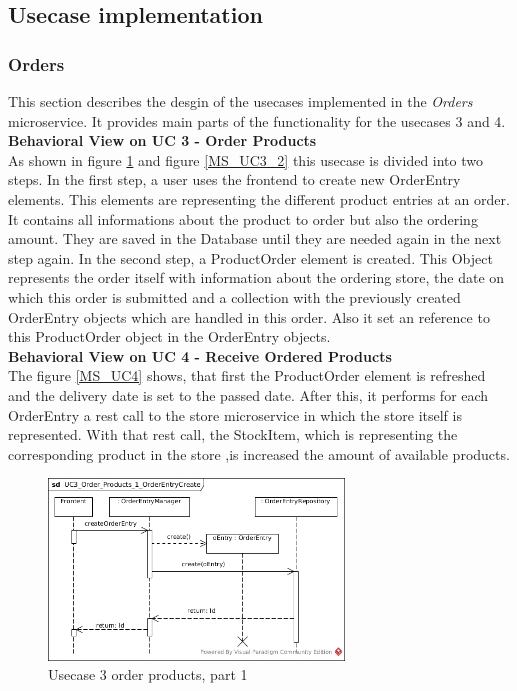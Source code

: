 	\subsection{Usecase implementation}\label{UsecaseSection}
	\FloatBarrier
		\subsubsection{Orders}
		This section describes the desgin of the usecases implemented in the \textit{Orders} microservice. It provides main parts of the functionality for the usecases 3 and 4.\\
		
		\textbf{Behavioral View on UC 3 - Order Products} \\
		As shown in figure \ref{MS_UC3_1} and figure \ref{MS_UC3_2} this usecase is divided into two steps. In the first step, a user uses the frontend to create new OrderEntry elements. This elements are representing the different product entries at an order. It contains all informations about the product to order but also the ordering amount. They are saved in the Database until they are needed again in the next step again. 
		In the second step, a ProductOrder element is created. This Object represents the order itself with information about the ordering store, the date on which this order is submitted and a collection with the previously created OrderEntry objects  which are handled in this order. Also it set an reference to this ProductOrder object in the OrderEntry objects.\\
		
		\textbf{Behavioral View on UC 4 - Receive Ordered Products} \\
		The figure \ref{MS_UC4} shows, that first the ProductOrder element is refreshed and the delivery date is set to the passed date.
		After this, it performs for each OrderEntry a rest call to the store microservice in which the store itself is represented. With that rest call, the StockItem, which is representing the corresponding product in the store ,is increased the amount of available products.
		
			\begin{figure}[!h]
				\centering
				\includegraphics[width = 0.7\textwidth]{img/UC3_Order_Products_1_OrderEntryCreate.jpg}
				\caption{Usecase 3 order products, part 1}
				\label{MS_UC3_1}
			\end{figure}
			
